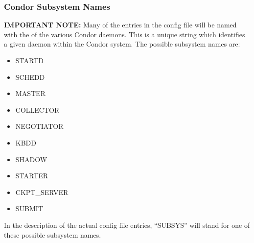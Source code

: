 \subsubsection{\label{sec:Condor-Subsystem-Names}
Condor Subsystem Names}

\textbf{IMPORTANT NOTE:} Many of the entries in the config file will
be named with the  of the various Condor daemons.
This is a unique string which identifies a given daemon within the
Condor system.  The possible subsystem names are:

\begin{itemize}
\item STARTD
\item SCHEDD
\item MASTER
\item COLLECTOR
\item NEGOTIATOR
\item KBDD 
\item SHADOW
\item STARTER
\item CKPT\_SERVER
\item SUBMIT
\label{list:subsystem names}
\end{itemize}

In the description of the actual config file entries, ``SUBSYS'' will
stand for one of these possible subsystem names.

